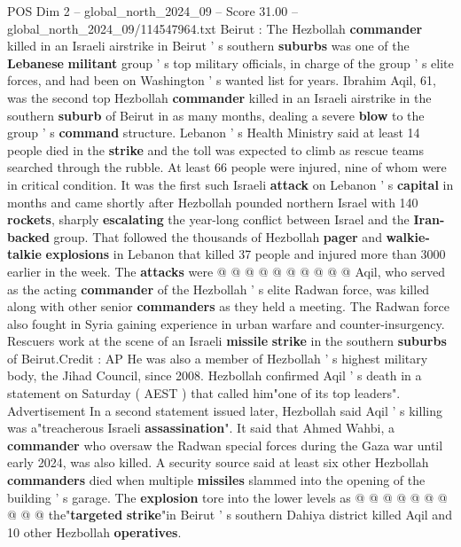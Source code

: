 \begin{textsample}{POS Dim 2 – global\_north\_2024\_09 – Score 31.00 – global\_north\_2024\_09/114547964.txt}  \label{ex:f2_pos_123}
Beirut : The Hezbollah \textbf{commander} killed in an Israeli airstrike in Beirut ' s southern \textbf{suburbs} was one of the \textbf{Lebanese} \textbf{militant} group ' s top military officials, in charge of the group ' s elite forces, and had been on Washington ' s wanted list for years.
Ibrahim Aqil, 61, was the second top Hezbollah \textbf{commander} killed in an Israeli airstrike in the southern \textbf{suburb} of Beirut in as many months, dealing a severe \textbf{blow} to the group ' s \textbf{command} structure.
Lebanon ' s Health Ministry said at least 14 people died in the \textbf{strike} and the toll was expected to climb as rescue teams searched through the rubble.
At least 66 people were injured, nine of whom were in critical condition.
It was the first such Israeli \textbf{attack} on Lebanon ' s \textbf{capital} in months and came shortly after Hezbollah pounded northern Israel with 140 \textbf{rockets}, sharply \textbf{escalating} the year-long conflict between Israel and the \textbf{Iran-backed} group.
That followed the thousands of Hezbollah \textbf{pager} and \textbf{walkie-talkie} \textbf{explosions} in Lebanon that killed 37 people and injured more than 3000 earlier in the week.
The \textbf{attacks} were @ @ @ @ @ @ @ @ @ @ Aqil, who served as the acting \textbf{commander} of the Hezbollah ' s elite Radwan force, was killed along with other senior \textbf{commanders} as they held a meeting.
The Radwan force also fought in Syria gaining experience in urban warfare and counter-insurgency.
Rescuers work at the scene of an Israeli \textbf{missile} \textbf{strike} in the southern \textbf{suburbs} of Beirut.Credit : AP He was also a member of Hezbollah ' s highest military body, the Jihad Council, since 2008.
Hezbollah confirmed Aqil ' s death in a statement on Saturday ( AEST ) that called him"one of its top leaders".
Advertisement In a second statement issued later, Hezbollah said Aqil ' s killing was a"treacherous Israeli \textbf{assassination}".
It said that Ahmed Wahbi, a \textbf{commander} who oversaw the Radwan special forces during the Gaza war until early 2024, was also killed.
A security source said at least six other Hezbollah \textbf{commanders} died when multiple \textbf{missiles} slammed into the opening of the building ' s garage.
The \textbf{explosion} tore into the lower levels as @ @ @ @ @ @ @ @ @ @ the"\textbf{targeted} \textbf{strike}"in Beirut ' s southern Dahiya district killed Aqil and 10 other Hezbollah \textbf{operatives}.

\end{textsample}
